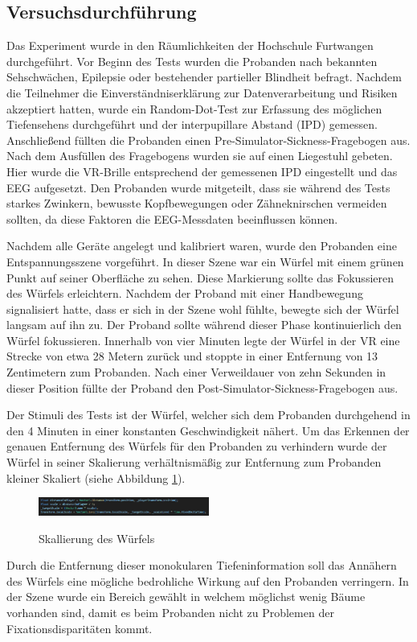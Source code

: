 \documentclass[conference]{IEEEtran}
\begin{document}
\subsection{Versuchsdurchführung}
Das Experiment wurde in den Räumlichkeiten der Hochschule Furtwangen durchgeführt. Vor Beginn des Tests wurden die Probanden nach bekannten Sehschwächen, Epilepsie oder bestehender partieller Blindheit befragt. Nachdem die Teilnehmer die Einverständniserklärung zur Datenverarbeitung und Risiken akzeptiert hatten, wurde ein Random-Dot-Test zur Erfassung des möglichen Tiefensehens durchgeführt und der interpupillare Abstand (IPD) gemessen. Anschließend füllten die Probanden einen Pre-Simulator-Sickness-Fragebogen aus. Nach dem Ausfüllen des Fragebogens wurden sie auf einen Liegestuhl gebeten. Hier wurde die VR-Brille entsprechend der gemessenen IPD eingestellt und das EEG aufgesetzt. Den Probanden wurde mitgeteilt, dass sie während des Tests starkes Zwinkern, bewusste Kopfbewegungen oder Zähneknirschen vermeiden sollten, da diese Faktoren die EEG-Messdaten beeinflussen können.

Nachdem alle Geräte angelegt und kalibriert waren, wurde den Probanden eine Entspannungsszene vorgeführt. In dieser Szene war ein Würfel mit einem grünen Punkt auf seiner Oberfläche zu sehen. Diese Markierung sollte das Fokussieren des Würfels erleichtern. Nachdem der Proband mit einer Handbewegung signalisiert hatte, dass er sich in der Szene wohl fühlte, bewegte sich der Würfel langsam auf ihn zu. Der Proband sollte während dieser Phase kontinuierlich den Würfel fokussieren. Innerhalb von vier Minuten legte der Würfel in der VR eine Strecke von etwa 28 Metern zurück und stoppte in einer Entfernung von 13 Zentimetern zum Probanden. Nach einer Verweildauer von zehn Sekunden in dieser Position füllte der Proband den Post-Simulator-Sickness-Fragebogen aus.

Der Stimuli des Tests ist der Würfel, welcher sich dem Probanden durchgehend in den 4 Minuten in einer konstanten Geschwindigkeit nähert. Um das Erkennen der genauen Entfernung des Würfels für den Probanden zu verhindern wurde der Würfel in seiner Skalierung verhältnismäßig zur Entfernung zum Probanden kleiner Skaliert (siehe Abbildung \ref{fig:scale_cube}). 
\begin{figure}[ht]
	\centering
	\includegraphics[width=0.5\textwidth]{assets/Scalling.jpg} \\
	\caption{Skallierung des Würfels}
	\label{fig:scale_cube}
\end{figure}
Durch die Entfernung dieser monokularen Tiefeninformation soll das Annähern des Würfels eine mögliche bedrohliche Wirkung auf den Probanden verringern. In der Szene wurde ein Bereich gewählt in welchem möglichst wenig Bäume  vorhanden sind, damit es beim Probanden nicht zu Problemen der Fixationsdisparitäten kommt.
\end{document}
